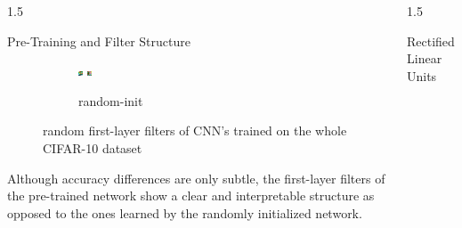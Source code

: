 \documentclass[final]{beamer}
\newlength{\onecolwid}
\begin{document}
\begin{frame}[t]
\begin{columns}[t]
\begin{column}{1.5\onecolwid}
\begin{alertblock}{Pre-Training and Filter Structure}
\begin{figure}
\begin{subfigure}{.4\linewidth}
					\includegraphics[width=0.1\linewidth]{graphics/cifar_filters/random_17.png} %
					\includegraphics[width=0.1\linewidth]{graphics/cifar_filters/random_18.png}
					\caption{random-init}
				\end{subfigure}

				\caption{random first-layer filters of CNN's trained on the whole CIFAR-10 dataset}

			\end{figure}

			Although accuracy differences are only subtle, the first-layer filters of the pre-trained network show a clear and interpretable structure as opposed to the ones learned by the randomly initialized network.

		\end{alertblock}

	\end{column}

	\begin{column}{1.5\onecolwid}

		\begin{alertblock}{Rectified Linear Units}

			\begin{figure}
				\centering

				\begin{subfigure}{0.4\linewidth}


\end{subfigure}
\end{figure}
\end{alertblock}
\end{column}
\end{columns}
\end{frame}
\end{document}

